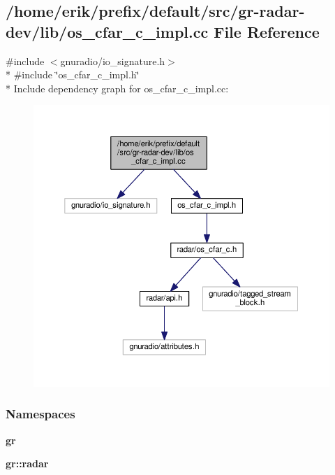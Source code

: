\subsection{/home/erik/prefix/default/src/gr-\/radar-\/dev/lib/os\+\_\+cfar\+\_\+c\+\_\+impl.cc File Reference}
\label{os__cfar__c__impl_8cc}
{\ttfamily \#include $<$gnuradio/io\+\_\+signature.\+h$>$}\\*
{\ttfamily \#include \char`\"{}os\+\_\+cfar\+\_\+c\+\_\+impl.\+h\char`\"{}}\\*
Include dependency graph for os\+\_\+cfar\+\_\+c\+\_\+impl.\+cc\+:
\nopagebreak
\begin{figure}[H]
\begin{center}
\leavevmode
\includegraphics[width=350pt]{d0/d40/os__cfar__c__impl_8cc__incl}
\end{center}
\end{figure}
\subsubsection*{Namespaces}
\begin{DoxyCompactItemize}
\item 
 {\bf gr}
\item 
 {\bf gr\+::radar}
\end{DoxyCompactItemize}
